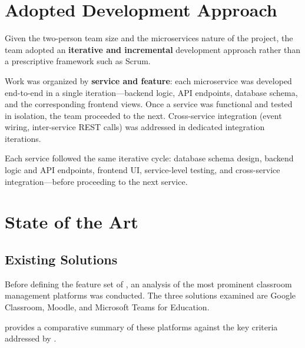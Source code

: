 \section{Adopted Development Approach}
\label{sec:methodology}

Given the two-person team size and the microservices nature of the project, the team adopted an \textbf{iterative and incremental} development approach rather than a prescriptive framework such as Scrum.

Work was organized by \textbf{service and feature}: each microservice was developed end-to-end in a single iteration---backend logic, API endpoints, database schema, and the corresponding frontend views.
Once a service was functional and tested in isolation, the team proceeded to the next.
Cross-service integration (event wiring, inter-service REST calls) was addressed in dedicated integration iterations.

Each service followed the same iterative cycle: database schema design, backend logic and API endpoints, frontend UI, service-level testing, and cross-service integration---before proceeding to the next service.

\section{State of the Art}
\label{sec:state-of-art}


\subsection{Existing Solutions}
\label{sec:existing-solutions}

Before defining the feature set of \eduspace{}, an analysis of the most prominent classroom management platforms was conducted.
The three solutions examined are Google Classroom, Moodle, and Microsoft Teams for Education.

\medskip
{} provides a comparative summary of these platforms against the key criteria addressed by \eduspace{}.

